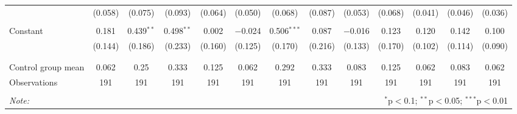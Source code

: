 \begin{tabular}{@{\extracolsep{5pt}}lcccccccccccc}
  & (0.058) & (0.075) & (0.093) & (0.064) & (0.050) & (0.068) & (0.087) & (0.053) & (0.068) & (0.041) & (0.046) & (0.036) \\ 
  & & & & & & & & & & & & \\ 
 Constant & 0.181 & 0.439$^{**}$ & 0.498$^{**}$ & 0.002 & $-$0.024 & 0.506$^{***}$ & 0.087 & $-$0.016 & 0.123 & 0.120 & 0.142 & 0.100 \\ 
  & (0.144) & (0.186) & (0.233) & (0.160) & (0.125) & (0.170) & (0.216) & (0.133) & (0.170) & (0.102) & (0.114) & (0.090) \\ 
  & & & & & & & & & & & & \\ 
\hline \\[-1.8ex] 
Control group mean & 0.062 & 0.25 & 0.333 & 0.125 & 0.062 & 0.292 & 0.333 & 0.083 & 0.125 & 0.062 & 0.083 & 0.062 \\ 
Observations & 191 & 191 & 191 & 191 & 191 & 191 & 191 & 191 & 191 & 191 & 191 & 191 \\ 
\hline 
\hline \\[-1.8ex] 
\textit{Note:}  & \multicolumn{12}{r}{$^{*}$p$<$0.1; $^{**}$p$<$0.05; $^{***}$p$<$0.01} \\ 
\end{tabular} 
